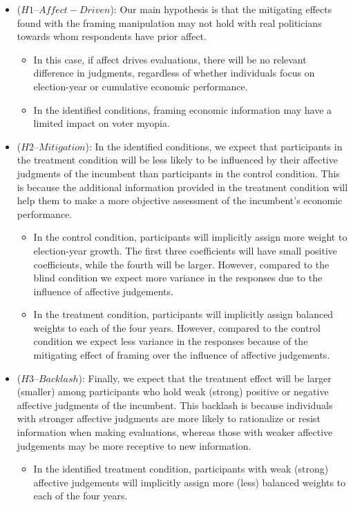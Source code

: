 \documentclass[
]{article}
\providecommand{\tightlist}{%
  \setlength{\itemsep}{0pt}\setlength{\parskip}{0pt}}
\begin{document}
\begin{itemize}
\tightlist
\item
  (\(H1 – Affect-Driven\)): Our main hypothesis is that the mitigating
  effects found with the framing manipulation may not hold with real
  politicians towards whom respondents have prior affect.

  \begin{itemize}
  \tightlist
  \item
    In this case, if affect drives evaluations, there will be no
    relevant difference in judgments, regardless of whether individuals
    focus on election-year or cumulative economic performance.
  \item
    In the identified conditions, framing economic information may have
    a limited impact on voter myopia.
  \end{itemize}
\item
  (\(H2 – Mitigation\)): In the identified conditions, we expect that
  participants in the treatment condition will be less likely to be
  influenced by their affective judgments of the incumbent than
  participants in the control condition. This is because the additional
  information provided in the treatment condition will help them to make
  a more objective assessment of the incumbent's economic performance.

  \begin{itemize}
  \tightlist
  \item
    In the control condition, participants will implicitly assign more
    weight to election-year growth. The first three coefficients will
    have small positive coefficients, while the fourth will be larger.
    However, compared to the blind condition we expect more variance in
    the responses due to the influence of affective judgements.
  \item
    In the treatment condition, participants will implicitly assign
    balanced weights to each of the four years. However, compared to the
    control condition we expect less variance in the responses because
    of the mitigating effect of framing over the influence of affective
    judgements.
  \end{itemize}
\item
  (\(H3 – Backlash\)): Finally, we expect that the treatment effect will
  be larger (smaller) among participants who hold weak (strong) positive
  or negative affective judgments of the incumbent. This backlash is
  because individuals with stronger affective judgments are more likely
  to rationalize or resist information when making evaluations, whereas
  those with weaker affective judgements may be more receptive to new
  information.

  \begin{itemize}
  \tightlist
  \item
    In the identified treatment condition, participants with weak
    (strong) affective judgements will implicitly assign more (less)
    balanced weights to each of the four years.
  \end{itemize}
\end{itemize}
\end{document}
